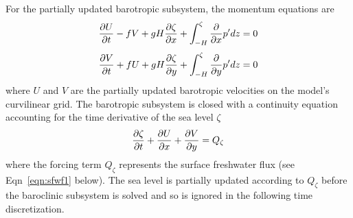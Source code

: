 For the partially updated barotropic subsystem, the momentum equations are
\begin{equation}
\label{eqn:barotropic_mom_u}
{\partial U \over{\partial t}}
- f V
+ g H {\partial \zeta \over{\partial x}}
+ \int_{-H}^{\zeta} {\partial \over{\partial x}}p^{\prime}dz
= 0
\end{equation}
\begin{equation}
\label{eqn:barotropic_mom_v}
{\partial V \over{\partial t}}
+ f U
+ g H {\partial \zeta \over{\partial y}}
+ \int_{-H}^{\zeta} {\partial \over{\partial y}}p^{\prime}dz
= 0
\end{equation}
where $U$ and $V$ are the partially updated barotropic velocities 
on the model's curvilinear grid.
The barotropic subsystem is closed with a continuity equation accounting for the
time derivative of the sea level $\zeta$
\begin{equation}
\label{eqn:barotropic_cont}
  {\partial \zeta \over{\partial t}}
+ {\partial U     \over{\partial x}}
+ {\partial V     \over{\partial y}}
=
Q_{\zeta}
\end{equation}
where the forcing term $Q_{\zeta}$ represents the surface freshwater flux 
(see Eqn~\ref{eqn:sfwf1} below).
The sea level is partially updated according to $Q_{\zeta}$ before the
baroclinic subsystem is solved and so is ignored in the following time discretization.

